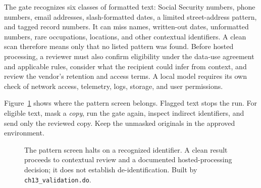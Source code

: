 \documentclass[
    a4paper,
    fontsize=10pt,
    twoside=true,
    numbers=noenddot,
]{kaobook}
\begin{document}
The gate recognizes six classes of formatted text: Social Security numbers, phone numbers, email addresses, slash-formatted dates, a limited street-address pattern, and tagged record numbers. It can miss names, written-out dates, unformatted numbers, rare occupations, locations, and other contextual identifiers. A clean scan therefore means only that no listed pattern was found. Before hosted processing, a reviewer must also confirm eligibility under the data-use agreement and applicable rules, consider what the recipient could infer from context, and review the vendor's retention and access terms. A local model requires its own check of network access, telemetry, logs, storage, and user permissions.

Figure~\ref{fig:ch13-aigate} shows where the pattern screen belongs. Flagged text stops the run. For eligible text, mask a \emph{copy}, run the gate again, inspect indirect identifiers, and send only the reviewed copy. Keep the unmasked originals in the approved environment.

\begin{figure}[htbp]
\centering
{}
\caption[The privacy pattern screen in a coding pipeline]{The pattern screen halts on a recognized identifier. A clean result proceeds to contextual review and a documented hosted-processing decision; it does not establish de-identification. Built by \texttt{ch13\_validation.do}.}
\label{fig:ch13-aigate}
\end{figure}
\end{document}
